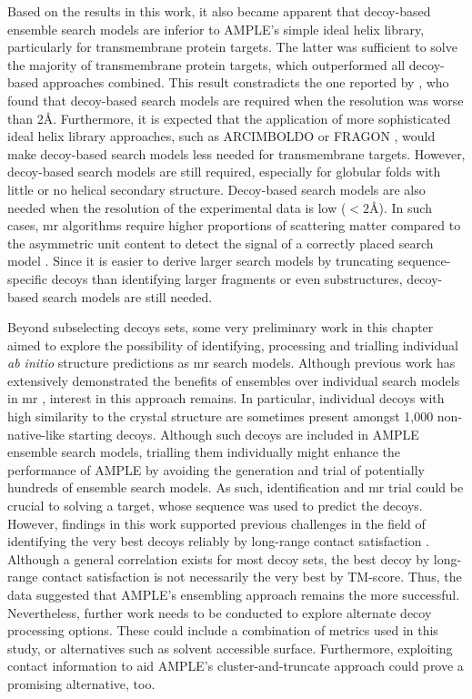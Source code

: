 Based on the results in this work, it also became apparent that decoy-based ensemble search models are inferior to AMPLE's simple ideal helix library, particularly for transmembrane protein targets. The latter was sufficient to solve the majority of transmembrane protein targets, which outperformed all decoy-based approaches combined. This result constradicts the one reported by \textcite{Thomas2017-sh}, who found that decoy-based search models are required when the resolution was worse than 2\AA. Furthermore, it is expected that the application of more sophisticated ideal helix library approaches, such as ARCIMBOLDO \cite{Millan2015-uf} or FRAGON \cite{Jenkins2018-gf}, would make decoy-based search models less needed for transmembrane targets. However, decoy-based search models are still required, especially for globular folds with little or no helical secondary structure. Decoy-based search models are also needed when the resolution of the experimental data is low ($<2$\AA). In such cases, \gls{mr} algorithms require higher proportions of scattering matter compared to the asymmetric unit content to detect the signal of a correctly placed search model \cite{McCoy2017-cz}. Since it is easier to derive larger search models by truncating sequence-specific decoys than identifying larger fragments or even substructures, decoy-based search models are still needed.

Beyond subselecting decoys sets, some very preliminary work in this chapter aimed to explore the possibility of identifying, processing and trialling individual \textit{ab initio} structure predictions as \gls{mr} search models. Although previous work has extensively demonstrated the benefits of ensembles over individual search models in \gls{mr} \cite{Rigden2018-zt,Keegan2018-kn,Thomas2015-wu}, interest in this approach remains. In particular, individual decoys with high similarity to the crystal structure are sometimes present amongst 1,000 non-native-like starting decoys. Although such decoys are included in AMPLE ensemble search models, trialling them individually might enhance the performance of AMPLE by avoiding the generation and trial of potentially hundreds of ensemble search models. As such, identification and \gls{mr} trial could be crucial to solving a target, whose sequence was used to predict the decoys. However, findings in this work supported previous challenges in the field of identifying the very best decoys reliably by long-range contact satisfaction \cite{Adhikari2018-lj,De_Oliveira2016-gj,Kosciolek2014-bt}. Although a general correlation exists for most decoy sets, the best decoy by long-range contact satisfaction is not necessarily the very best by TM-score. Thus, the data suggested that AMPLE's ensembling approach remains the more successful. Nevertheless, further work needs to be conducted to explore alternate decoy processing options. These could include a combination of metrics used in this study, or alternatives such as solvent accessible surface. Furthermore, exploiting contact information to aid AMPLE's cluster-and-truncate approach could prove a promising alternative, too.

